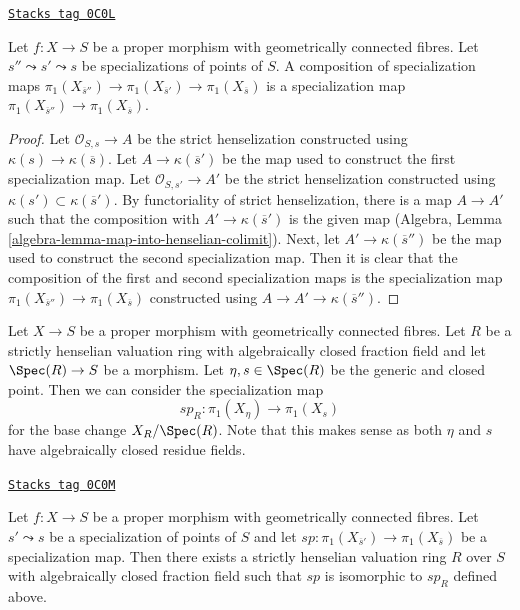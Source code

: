 \begin{lemma}
\label{pione-lemma-specialization-map-composition}
\href{https://stacks.math.columbia.edu/tag/0C0L}{\texttt{Stacks tag 0C0L}}

Let $f : X \to S$ be a proper morphism with geometrically connected fibres.
Let $s'' \leadsto s' \leadsto s$ be specializations of points of $S$.
A composition of specialization maps
$\pi_1(X_{\overline{s}''}) \to \pi_1(X_{\overline{s}'}) \to
\pi_1(X_{\overline{s}})$ is a specialization map
$\pi_1(X_{\overline{s}''}) \to \pi_1(X_{\overline{s}})$.
\end{lemma}

\begin{proof}
Let $\mathcal{O}_{S, s} \to A$ be the strict henselization
constructed using $\kappa(s) \to \kappa(\overline{s})$.
Let $A \to \kappa(\overline{s}')$ be the map used to construct
the first specialization map. Let $\mathcal{O}_{S, s'} \to A'$
be the strict henselization constructed using
$\kappa(s') \subset \kappa(\overline{s}')$.
By functoriality of strict henselization, there is a map
$A \to A'$ such that the composition with $A' \to \kappa(\overline{s}')$
is the given map
(Algebra, Lemma \ref{algebra-lemma-map-into-henselian-colimit}).
Next, let $A' \to \kappa(\overline{s}'')$ be the map used to
construct the second specialization map. Then it is clear that
the composition of the first and second specialization maps
is the specialization map
$\pi_1(X_{\overline{s}''}) \to \pi_1(X_{\overline{s}})$
constructed using $A \to A' \to \kappa(\overline{s}'')$.
\end{proof}

Let $X \to S$ be a proper morphism with geometrically connected fibres.
Let $R$ be a strictly henselian valuation ring with algebraically
closed fraction field and let $\Spec(R) \to S$
be a morphism. Let $\eta, s \in \Spec(R)$ be the generic and closed point.
Then we can consider the specialization map
$$
sp_R : \pi_1(X_\eta) \to \pi_1(X_s)
$$
for the base change $X_R/\Spec(R)$. Note that this makes sense as both
$\eta$ and $s$ have algebraically closed residue fields.

\begin{lemma}
\label{pione-lemma-specialization-map-valuation-ring}
\href{https://stacks.math.columbia.edu/tag/0C0M}{\texttt{Stacks tag 0C0M}}

Let $f : X \to S$ be a proper morphism with geometrically connected fibres.
Let $s' \leadsto s$ be a specialization of points of $S$ and let
$sp : \pi_1(X_{\overline{s}'}) \to \pi_1(X_{\overline{s}})$
be a specialization map. Then there exists a strictly henselian
valuation ring $R$ over $S$ with algebraically closed fraction field
such that $sp$ is isomorphic to $sp_R$ defined above.
\end{lemma}

